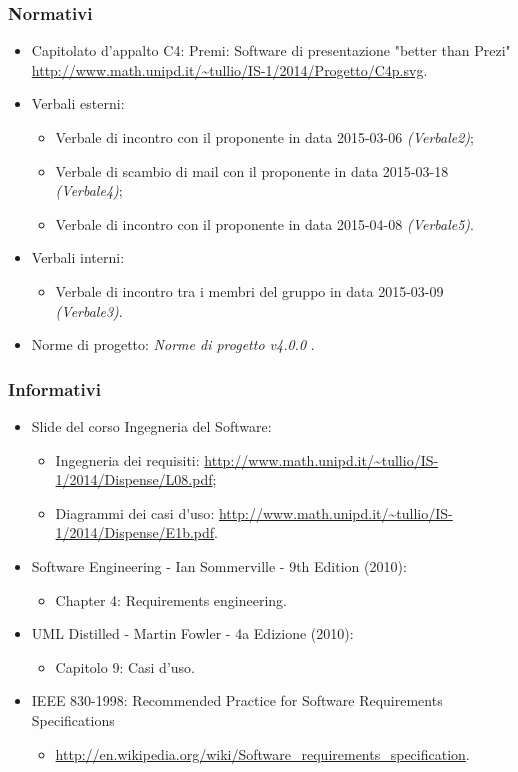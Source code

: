 \subsubsection{Normativi}
\begin{itemize}
	\item Capitolato d'appalto C4: Premi: Software di presentazione "better than Prezi"
	\newline \url{http://www.math.unipd.it/~tullio/IS-1/2014/Progetto/C4p.svg}.
	\item Verbali esterni:
	\begin{itemize}
		\item \gls{Verbale} di incontro con il proponente in data 2015-03-06 \textit{(Verbale2)};
		\item \gls{Verbale} di scambio di mail con il proponente in data 2015-03-18 \textit{(Verbale4)};
		\item \gls{Verbale} di incontro con il proponente in data 2015-04-08 \textit{(Verbale5)}.
	\end{itemize}
	\item Verbali interni:
	\begin{itemize}
		\item \gls{Verbale} di incontro tra i membri del gruppo in data 2015-03-09 \textit{(Verbale3)}.
	\end{itemize}
	\item Norme di progetto: \textit{Norme di progetto v4.0.0} .
\end{itemize}
\subsubsection{Informativi}
\begin{itemize}
	\item \gls{Slide} del corso Ingegneria del Software:
	\begin{itemize}
		\item Ingegneria dei requisiti: \url{http://www.math.unipd.it/~tullio/IS-1/2014/Dispense/L08.pdf};
		\item Diagrammi dei \gls{casi d'uso}: \url{http://www.math.unipd.it/~tullio/IS-1/2014/Dispense/E1b.pdf}.
	\end{itemize}
	\item Software Engineering - Ian Sommerville - 9th Edition (2010):
	\begin{itemize}
		\item Chapter 4: Requirements engineering.
	\end{itemize}
	\item \gls{UML} Distilled - Martin Fowler - 4a Edizione (2010):
	\begin{itemize}
		\item Capitolo 9: Casi d’uso.
	\end{itemize}
	\item IEEE 830-1998: Recommended Practice for Software Requirements Specifications
	\begin{itemize}
		\item \url{http://en.wikipedia.org/wiki/Software_requirements_specification}.
	\end{itemize}
\end{itemize}

